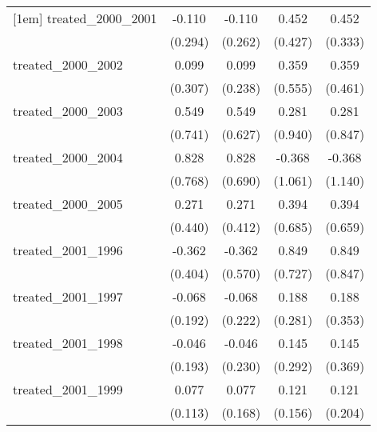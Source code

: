{\begin{tabular}{l*{4}{c}}
[1em]
treated\_2000\_2001&      -0.110         &      -0.110         &       0.452         &       0.452         \\
            &     (0.294)         &     (0.262)         &     (0.427)         &     (0.333)         \\
[1em]
treated\_2000\_2002&       0.099         &       0.099         &       0.359         &       0.359         \\
            &     (0.307)         &     (0.238)         &     (0.555)         &     (0.461)         \\
[1em]
treated\_2000\_2003&       0.549         &       0.549         &       0.281         &       0.281         \\
            &     (0.741)         &     (0.627)         &     (0.940)         &     (0.847)         \\
[1em]
treated\_2000\_2004&       0.828         &       0.828         &      -0.368         &      -0.368         \\
            &     (0.768)         &     (0.690)         &     (1.061)         &     (1.140)         \\
[1em]
treated\_2000\_2005&       0.271         &       0.271         &       0.394         &       0.394         \\
            &     (0.440)         &     (0.412)         &     (0.685)         &     (0.659)         \\
[1em]
treated\_2001\_1996&      -0.362         &      -0.362         &       0.849         &       0.849         \\
            &     (0.404)         &     (0.570)         &     (0.727)         &     (0.847)         \\
[1em]
treated\_2001\_1997&      -0.068         &      -0.068         &       0.188         &       0.188         \\
            &     (0.192)         &     (0.222)         &     (0.281)         &     (0.353)         \\
[1em]
treated\_2001\_1998&      -0.046         &      -0.046         &       0.145         &       0.145         \\
            &     (0.193)         &     (0.230)         &     (0.292)         &     (0.369)         \\
[1em]
treated\_2001\_1999&       0.077         &       0.077         &       0.121         &       0.121         \\
            &     (0.113)         &     (0.168)         &     (0.156)         &     (0.204)         \\

\end{tabular}}
